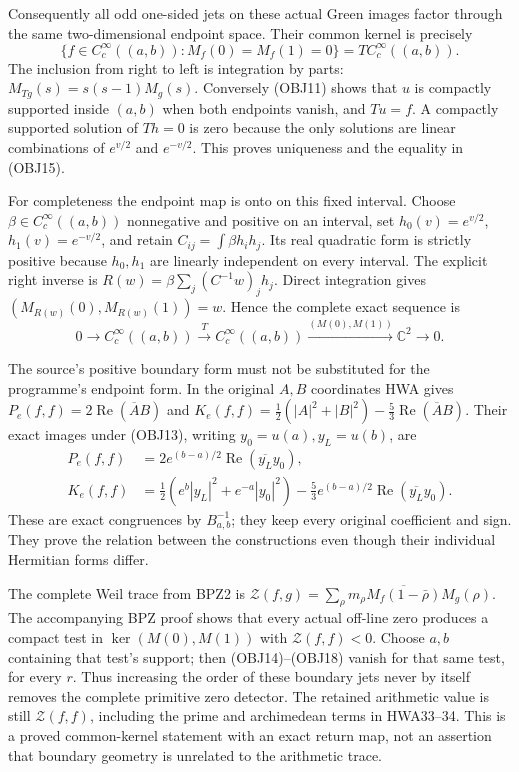 Consequently all odd one-sided jets on these actual Green images
factor through the same two-dimensional endpoint space. Their common
kernel is precisely
\begin{equation}\tag{OBJ15}
 \{f\in C_c^\infty((a,b)):M_f(0)=M_f(1)=0\}
 =T C_c^\infty((a,b)).
\end{equation}
The inclusion from right to left is integration by parts:
$M_{Tg}(s)=s(s-1)M_g(s)$. Conversely (OBJ11) shows that $u$ is
compactly supported inside $(a,b)$ when both endpoints vanish, and
$Tu=f$. A compactly supported solution of $Th=0$ is zero because
the only solutions are linear combinations of $e^{v/2}$ and
$e^{-v/2}$. This proves uniqueness and the equality in (OBJ15).

For completeness the endpoint map is onto on this fixed interval.
Choose $\beta\in C_c^\infty((a,b))$ nonnegative and positive on an
interval, set $h_0(v)=e^{v/2}$, $h_1(v)=e^{-v/2}$, and retain
$C_{ij}=\int\beta h_i h_j$. Its real quadratic form is strictly
positive because $h_0,h_1$ are linearly independent on every interval.
The explicit right inverse is
$R(w)=\beta\sum_j(C^{-1}w)_j h_j$. Direct integration gives
$(M_{R(w)}(0),M_{R(w)}(1))=w$. Hence the complete exact sequence is
\begin{equation}\tag{OBJ16}
 0\longrightarrow C_c^\infty((a,b))\xrightarrow{T}
 C_c^\infty((a,b))\xrightarrow{(M(0),M(1))}\mathbb C^2
 \longrightarrow0.
\end{equation}

The source's positive boundary form must not be substituted for the
programme's endpoint form. In the original $A,B$ coordinates HWA gives
$P_e(f,f)=2\operatorname{Re}(\overline A B)$ and
$K_e(f,f)=\frac12(|A|^2+|B|^2)-\frac53\operatorname{Re}(\overline A B)$.
Their exact images under (OBJ13), writing $y_0=u(a),y_L=u(b)$, are
\begin{align}
 P_e(f,f)&=2e^{(b-a)/2}\operatorname{Re}(\overline{y_L}y_0),\tag{OBJ17}\\
 K_e(f,f)&=\tfrac12(e^b|y_L|^2+e^{-a}|y_0|^2)
 -\tfrac53e^{(b-a)/2}\operatorname{Re}(\overline{y_L}y_0).\tag{OBJ18}
\end{align}
These are exact congruences by $B_{a,b}^{-1}$; they keep every original
coefficient and sign. They prove the relation between the constructions
even though their individual Hermitian forms differ.

The complete Weil trace from BPZ2 is
$\mathcal Z(f,g)=\sum_\rho m_\rho\overline{M_f(1-\bar\rho)}M_g(\rho)$.
The accompanying BPZ proof shows that every actual off-line zero
produces a compact test in $\ker(M(0),M(1))$ with
$\mathcal Z(f,f)<0$. Choose $a,b$ containing that test's support;
then (OBJ14)--(OBJ18) vanish for that same test, for every $r$.
Thus increasing the order of these boundary jets never by itself
removes the complete primitive zero detector. The retained arithmetic
value is still $\mathcal Z(f,f)$, including the prime and archimedean
terms in HWA33--34. This is a proved common-kernel statement with an
exact return map, not an assertion that boundary geometry is unrelated
to the arithmetic trace.

